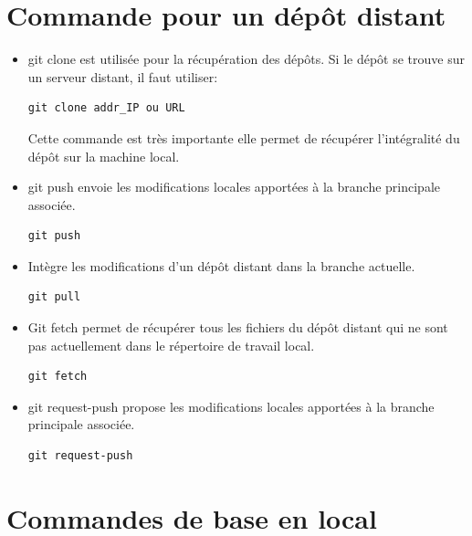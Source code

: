 \documentclass[french, 12pt]{article}%
\newcommand{\itemE}{\item[$\bullet$]}
\begin{document}
\section{Commande pour un dépôt distant}
\begin{itemize}
\itemE git clone est utilisée pour la récupération des dépôts. Si le dépôt se trouve sur un serveur distant, il faut utiliser:
\begin{lstlisting}[style=commande]
git clone addr_IP ou URL
\end{lstlisting}

Cette commande est très importante elle permet de récupérer l'intégralité du dépôt sur la machine local. 


\itemE git push envoie les modifications locales apportées à la branche principale associée.
\begin{lstlisting}[style=commande]
git push
\end{lstlisting}

\itemE Intègre les modifications d’un dépôt distant dans la branche actuelle.
\begin{lstlisting}[style=commande]
git pull
\end{lstlisting}

\itemE Git fetch permet de récupérer tous les fichiers du dépôt distant qui ne sont pas actuellement dans le répertoire de travail local.
\begin{lstlisting}[style=commande]
git fetch
\end{lstlisting}

\itemE git request-push propose les modifications locales apportées à la branche principale associée.
\begin{lstlisting}[style=commande]
git request-push
\end{lstlisting}


\end{itemize}

\section{Commandes de base en local}
\end{document}
